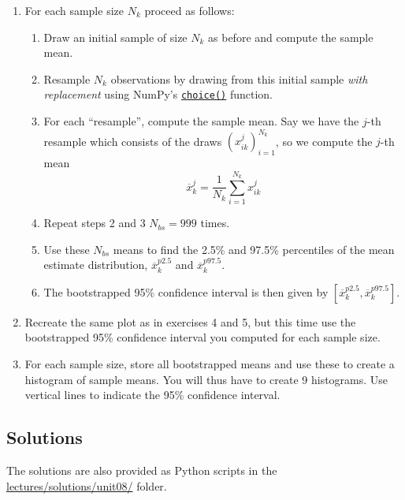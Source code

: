 \documentclass{scrartcl}
\providecommand{\tightlist}{%
      \setlength{\itemsep}{0pt}\setlength{\parskip}{0pt}}
\begin{document}
\begin{enumerate}
\def\labelenumi{\arabic{enumi}.}
\tightlist
\item
  For each sample size \(N_k\) proceed as follows:

  \begin{enumerate}
  \def\labelenumii{\arabic{enumii}.}
  \tightlist
  \item
    Draw an initial sample of size \(N_k\) as before and compute the
    sample mean.
  \item
    Resample \(N_k\) observations by drawing from this initial sample
    \emph{with}\\
    \emph{replacement} using NumPy's
    \href{https://numpy.org/doc/stable/reference/random/generated/numpy.random.Generator.choice.html}{\texttt{choice()}}
    function.
  \item
    For each ``resample'', compute the sample mean. Say we have the
    \(j\)-th resample which consists of the draws
    \((x_{ik}^j)_{i=1}^{N_k}\), so we compute the \(j\)-th mean \[
    \overline{x}_{k}^j = \frac{1}{N_k} \sum_{i=1}^{N_k} x_{ik}^j
    \]
  \item
    Repeat steps 2 and 3 \(N_{bs} = 999\) times.
  \item
    Use these \(N_{bs}\) means to find the 2.5\% and 97.5\% percentiles
    of the mean estimate distribution, \(\overline{x}_k^{p2.5}\) and
    \(\overline{x}_k^{p97.5}\).
  \item
    The bootstrapped 95\% confidence interval is then given by
    \(\left[\overline{x}_k^{p2.5}, \overline{x}_k^{p97.5}\right]\).
  \end{enumerate}
\item
  Recreate the same plot as in exercises 4 and 5, but this time use the
  bootstrapped 95\% confidence interval you computed for each sample
  size.
\item
  For each sample size, store all bootstrapped means and use these to
  create a histogram of sample means. You will thus have to create 9
  histograms. Use vertical lines to indicate the 95\% confidence
  interval.
\end{enumerate}


\hypertarget{solutions}{%
\subsection{Solutions}\label{solutions}}

The solutions are also provided as Python scripts in the
\href{../lectures/solutions/unit08}{lectures/solutions/unit08/} folder.
\end{document}
